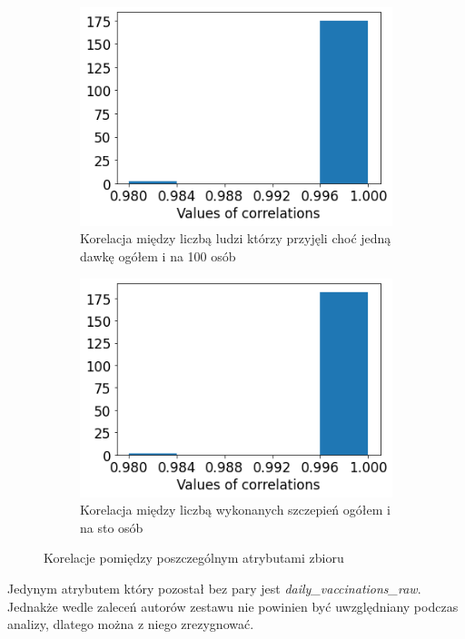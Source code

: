 \documentclass[12pt, oneside]{article}
\begin{document}
\begin{figure}[!ht]
  \begin{subfigure}[t]{.45\textwidth}
    \centering
    \includegraphics[width=\linewidth]{../img/null_column_diff3.png}
    \caption{Korelacja między liczbą ludzi którzy przyjęli choć jedną dawkę ogółem i na 100 osób}
  \end{subfigure}
  \hfill
  \begin{subfigure}[t]{.45\textwidth}
    \centering
    \includegraphics[width=\linewidth]{../img/null_column_diff4.png}
    \caption{Korelacja między liczbą wykonanych szczepień ogółem i na sto osób}
  \end{subfigure}
  \caption{Korelacje pomiędzy poszczególnym atrybutami zbioru}
\label{Rys:histOfCorrAttr}
\end{figure}


Jedynym atrybutem który pozostał bez pary jest \textit{daily\_vaccinations\_raw}. Jednakże wedle zaleceń autorów zestawu nie powinien być uwzględniany podczas analizy, dlatego można z niego zrezygnować. 
\end{document}
